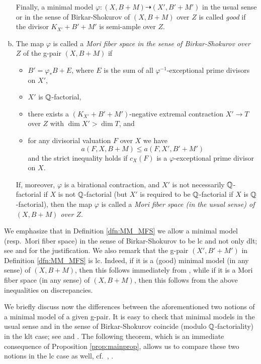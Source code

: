 \begin{dfn}
\begin{enumerate}[(a)]
			Finally, a minimal model $ \varphi \colon (X,B+M) \dashrightarrow (X',B'+M') $ in the usual sense or in the sense of Birkar-Shokurov of $ (X,B+M) $ over $ Z $ is called \emph{good} if the divisor $ K_{X'} + B' + M' $ is semi-ample over $ Z $.
			
			\item The map $\varphi$ is called a \emph{Mori fiber space in the sense of Birkar-Shokurov over $Z$} of the g-pair $(X,B+M)$ if 
			\begin{itemize}
				\item $ B' =\varphi_*B+E$, where $E$ is the sum of all $ \varphi^{-1} $-exceptional prime divisors on $ X' $, 
				
				\item $X'$ is $\mathbb{Q}$-factorial,
				
				\item there exists a $ (K_{X'} + B' + M') $-negative extremal contraction $ X' \to T $ over $ Z $ with $ \dim X' > \dim T $, and
				
				\item for any divisorial valuation $ F $ over $ X $ we have
				\[ a(F,X,B+M) \leq a(F,X',B'+M') \]
				and the strict inequality holds if $ c_X(F) $ is a $\varphi $-exceptional prime divisor on $ X $.
			\end{itemize}
			
			If, moreover, $\varphi$ is a birational contraction, and $X'$ is not necessarily $\mathbb{Q}$-factorial if $X$ is not $\mathbb{Q}$-factorial (but $X'$ is required to be $\mathbb{Q}$-factorial if $X$ is $\mathbb{Q}$-factorial), then the map $ \varphi $ is called a \emph{Mori fiber space (in the usual sense) of $ (X,B+M) $ over $ Z $}.
		\end{enumerate}
	\end{dfn}
	
	We emphasize that in Definition \ref{dfn:MM_MFS} we allow a minimal model  (resp.\ Mori fiber space) in the sense of Birkar-Shokurov to be lc and not only dlt; see \cite[Remark 2.4]{Hash18a} and \cite[p.\ 34, Comment]{Tsak21} for the justification. We also remark that the g-pair $ (X',B'+M')$ in Definition \ref{dfn:MM_MFS} is lc. Indeed, if it is a (good) minimal model (in any sense) of $ (X,B+M) $, then this follows immediately from \cite[Lemma 2.8(i)]{LMT}, while if it is a Mori fiber space (in any sense) of $ (X,B+M) $, then this follows from the above inequalities on discrepancies.
	
	\medskip
	
	We briefly discuss now the differences between the aforementioned two notions of a minimal model of a given g-pair. It is easy to check that minimal models in the usual sense and in the sense of Birkar-Shokurov coincide (modulo $\mathbb{Q}$-factoriality) in the klt case; see \cite[Remark 2.4(iii)]{Bir12b} and \cite[Subsection 2.2.4]{Tsak21}. The following theorem, which is an immediate consequence of Proposition \ref{prop:mainprop}, allows us to compare these two notions in the lc case as well, cf.\ \cite[Lemma 2.9(ii)]{LT22a}, \cite[Theorem 1.2(a)]{LT22b}.
	
